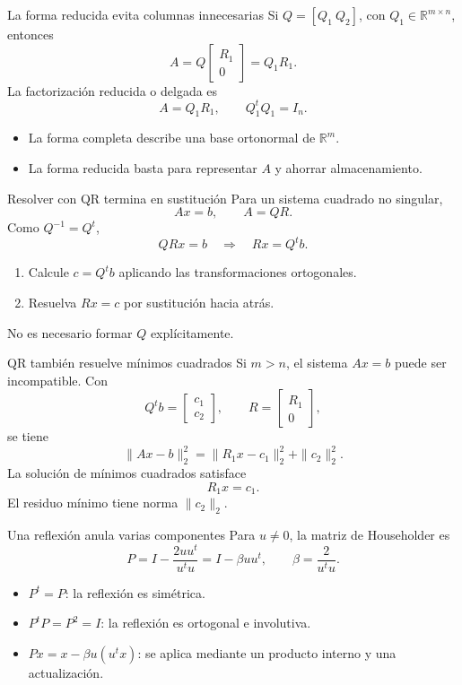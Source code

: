 \documentclass[aspectratio=169,12pt]{beamer}
\newcommand{\R}{\mathbb{R}}
\newcommand{\mat}[1]{\begin{bmatrix}#1\end{bmatrix}}
\begin{document}
\begin{frame}{La forma reducida evita columnas innecesarias}
Si $Q=[Q_1\ Q_2]$, con $Q_1\in\R^{m\times n}$, entonces
\[
A=Q\mat{R_1\\0}=Q_1R_1.
\]
La factorización reducida o delgada es
\[
\boxed{A=Q_1R_1},
\qquad Q_1^tQ_1=I_n.
\]
\begin{itemize}
  \item La forma completa describe una base ortonormal de $\R^m$.
  \item La forma reducida basta para representar $A$ y ahorrar almacenamiento.
\end{itemize}
\end{frame}

\begin{frame}{Resolver con QR termina en sustitución}
Para un sistema cuadrado no singular,
\[
Ax=b,
\qquad A=QR.
\]
Como $Q^{-1}=Q^t$,
\[
QRx=b
\quad\Longrightarrow\quad
Rx=Q^tb.
\]
\begin{enumerate}
  \item Calcule $c=Q^tb$ aplicando las transformaciones ortogonales.
  \item Resuelva $Rx=c$ por sustitución hacia atrás.
\end{enumerate}
No es necesario formar $Q$ explícitamente.
\end{frame}

\begin{frame}{QR también resuelve mínimos cuadrados}
Si $m>n$, el sistema $Ax=b$ puede ser incompatible. Con
\[
Q^tb=\mat{c_1\\c_2},
\qquad
R=\mat{R_1\\0},
\]
se tiene
\[
\|Ax-b\|_2^2
=\|R_1x-c_1\|_2^2+\|c_2\|_2^2.
\]
La solución de mínimos cuadrados satisface
\[
\boxed{R_1x=c_1}.
\]
El residuo mínimo tiene norma $\|c_2\|_2$.
\end{frame}

\begin{frame}{Una reflexión anula varias componentes}
Para $u\neq0$, la matriz de Householder es
\[
P=I-\frac{2uu^t}{u^tu}=I-\beta uu^t,
\qquad \beta=\frac{2}{u^tu}.
\]
\begin{itemize}
  \item $P^t=P$: la reflexión es simétrica.
  \item $P^tP=P^2=I$: la reflexión es ortogonal e involutiva.
  \item $Px=x-\beta u(u^tx)$: se aplica mediante un producto interno y una actualización.
\end{itemize}
\end{frame}
\end{document}
